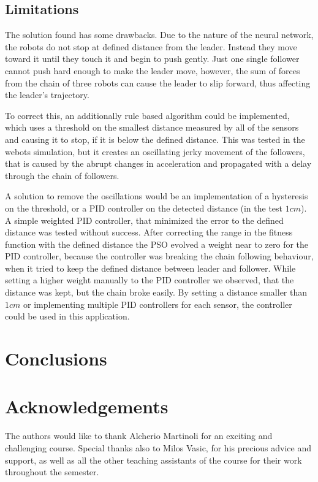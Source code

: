 \documentclass[a4paper, 10pt, conference]{ieeeconf}      %
\begin{document}
\subsection{Limitations}
The solution found has some drawbacks. Due to the nature of the neural network, the robots do not stop at defined distance from the leader. Instead they move toward it until they touch it and begin to push gently. Just one single follower cannot push hard enough to make the leader move, however, the sum of forces from the chain of three robots can cause the leader to slip forward, thus affecting the leader's trajectory.

To correct this, an additionally rule based algorithm could be implemented, which uses a threshold on the smallest distance measured by all of the sensors and causing it to stop, if it is below the defined distance. This was tested in the webots simulation, but it creates an oscillating jerky movement of the followers, that is caused by the abrupt changes in acceleration and propagated with a delay through the chain of followers. 

A solution to remove the oscillations would be an implementation of a hysteresis on the threshold, or a PID controller on the detected distance (in the test $1cm$). A simple weighted PID controller, that minimized the error to the defined distance was tested without success. After correcting the range in the fitness function with the defined distance the PSO evolved a weight near to zero for the PID controller, because the controller was breaking the chain following behaviour, when it tried to keep the defined distance between leader and follower. While setting a higher weight manually to the PID controller we observed, that the distance was kept, but the chain broke easily. By setting a distance smaller than $1cm$ or implementing multiple PID controllers for each sensor, the controller could be used in this application.

\section{Conclusions}

\section{Acknowledgements}
The authors would like to thank Alcherio Martinoli for an exciting and challenging course. Special thanks also to Milos Vasic, for his precious advice and support, as well as all the other teaching assistants of the course for their work throughout the semester.
\end{document}
